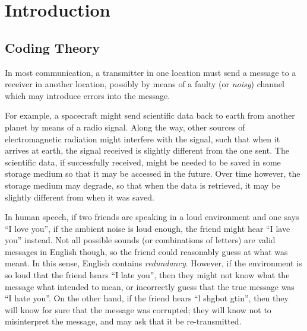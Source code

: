 \documentclass{report}
\begin{document}
\tableofcontents

\chapter{Introduction}\label{ch:intro}
  \section{Coding Theory}\label{sec:intro:coding}
    \FloatBarrier

    In most communication, a transmitter in one location must send a message to
    a receiver in another location, possibly by means of a faulty (or
    \textit{noisy}) channel which may introduce errors into the message.

    For example, a spacecraft might send scientific data back to earth from
    another planet by means of a radio signal.  Along the way, other sources of
    electromagnetic radiation might interfere with the signal, such that when it
    arrives at earth, the signal received is slightly different from the one
    sent.
    The scientific data, if successfully received, might be needed to be saved in
    some storage medium so that it may be accessed in the future.  Over time
    however, the storage medium may degrade, so that when the data is retrieved,
    it may be slightly different from when it was saved.

    In human speech, if two friends are speaking in a loud environment and one
    says ``I love you'', if the ambient noise is loud enough, the friend might
    hear ``I lave you'' instead.  Not all possible sounds (or combinations of
    letters) are valid messages in English though, so the friend could
    reasonably guess at what was meant.  In this sense, English contains
    \textit{redundancy}.  However, if the environment is so loud that the friend
    hears ``I late you'', then they might not know what the message what
    intended to mean, or incorrectly guess that the true message was ``I hate
    you''.  On the other hand, if the friend hears ``l shgbot gtin'', then they
    will know for sure that the message was corrupted; they will know not to
    misinterpret the message, and may ask that it be re-transmitted.
    \\
\end{document}
